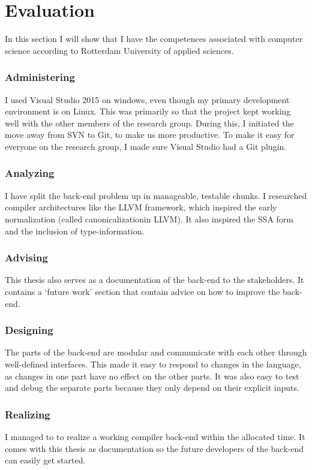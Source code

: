 \section{Evaluation}\label{evaluation}
In this section I will show that I have the competences associated with computer science according to Rotterdam University of applied sciences.

\subsubsection{Administering} 
I used Visual Studio 2015 on windows, even though my primary development environment is on Linux.
This was primarily so that the project kept working well with the other members of the research group.
During this, I initiated the move away from SVN to Git, to make us more productive.
To make it easy for everyone on the research group, I made sure Visual Studio had a Git plugin.

\subsubsection{Analyzing}
I have split the back-end problem up in manageable, testable chunks.
I researched compiler architectures like the LLVM framework, which inspired the early normalization (called canonicalizationin LLVM).
It also inspired the SSA form and the inclusion of type-information.

\subsubsection{Advising}
This thesis also serves as a documentation of the back-end to the stakeholders.
It contains a `future work' section that contain advice on how to improve the back-end.

\subsubsection{Designing}
The parts of the back-end are modular and communicate with each other through well-defined interfaces.
This made it easy to respond to changes in the language, as changes in one part have no effect on the other parts.
It was also easy to test and debug the separate parts because they only depend on their explicit inputs.

\subsubsection{Realizing}
I managed to to realize a working compiler back-end within the allocated time.
It comes with this thesis as documentation so the future developers of the back-end can easily get started.

